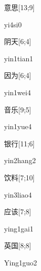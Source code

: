\begin{verbete}[yi4si0]{意思}[13;9]
\begin{pronuncia}{yi4si0}
\end{pronuncia}
\end{verbete}

\begin{verbete}{阴天}[6;4]
\begin{pronuncia}{yin1tian1}
\end{pronuncia}
\end{verbete}

\begin{verbete}{因为}[6;4]
\begin{pronuncia}{yin1wei4}
\end{pronuncia}
\end{verbete}

\begin{verbete}{音乐}[9;5]
\begin{pronuncia}{yin1yue4}
\end{pronuncia}
\end{verbete}

\begin{verbete}{银行}[11;6]
\begin{pronuncia}{yin2hang2}
\end{pronuncia}
\end{verbete}

\begin{verbete}{饮料}[7;10]
\begin{pronuncia}{yin3liao4}
\end{pronuncia}
\end{verbete}

\begin{verbete}{应该}[7;8]
\begin{pronuncia}{ying1gai1}
\end{pronuncia}
\end{verbete}

\begin{verbete}{英国}[8;8]
\begin{pronuncia}{Ying1guo2}
\end{pronuncia}
\end{verbete}

